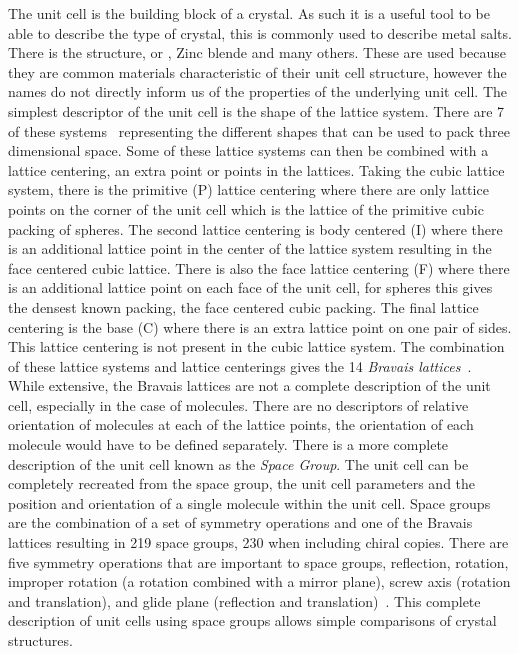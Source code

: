 The unit cell is the building block of a crystal. As such it is a useful tool to be able to describe the type of crystal, this is commonly used to describe metal salts. There is the  structure, or , Zinc blende and many others. These are used because they are common materials characteristic of their unit cell structure, however the names do not directly inform us of the properties of the underlying unit cell. The simplest descriptor of the unit cell is the shape of the lattice system. There are 7 of these systems~\figref{} representing the different shapes that can be used to pack three dimensional space. Some of these lattice systems can then be combined with a lattice centering, an extra point or points in the lattices. Taking the cubic lattice system, there is the primitive (P) lattice centering where there are only lattice points on the corner of the unit cell which is the lattice of the primitive cubic packing of spheres. The second lattice centering is body centered (I) where there is an additional lattice point in the center of the lattice system resulting in the face centered cubic lattice. There is also the face lattice centering (F) where there is an additional lattice point on each face of the unit cell, for spheres this gives the densest known packing, the face centered cubic packing. The final lattice centering is the base (C) where there is an extra lattice point on one pair of sides. This lattice centering is not present in the cubic lattice system. The combination of these lattice systems and lattice centerings gives the 14 \emph{Bravais lattices}~\figref{}. While extensive, the Bravais lattices are not a complete description of the unit cell, especially in the case of molecules. There are no descriptors of relative orientation of molecules at each of the lattice points, the orientation of each molecule would have to be defined separately. There is a more complete description of the unit cell known as the \emph{Space Group}. The unit cell can be completely recreated from the space group, the unit cell parameters and the position and orientation of a single molecule within the unit cell. Space groups are the combination of a set of symmetry operations and one of the Bravais lattices resulting in 219 space groups, 230 when including chiral copies. There are five symmetry operations that are important to space groups, reflection, rotation, improper rotation (a rotation combined with a mirror plane), screw axis (rotation and translation), and glide plane (reflection and translation)~\figref{}. This complete description of unit cells using space groups allows simple comparisons of crystal structures.


